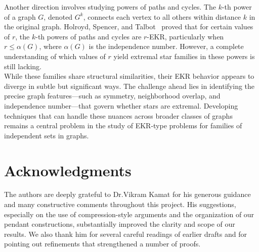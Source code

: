 \documentclass{article}
\theoremstyle{definition}
\newcommand{\1}{\mathbf{1}}
\begin{document}
\noindent Another direction involves studying powers of paths and cycles. The $k$-th power of a graph $G$, denoted $G^k$, connects each vertex to all others within distance $k$ in the original graph. Holroyd, Spencer, and Talbot~\cite{Holroyd2005} proved that for certain values of $r$, the $k$-th powers of paths and cycles are $r$-EKR, particularly when $r \leq \alpha(G)$, where $\alpha(G)$ is the independence number. However, a complete understanding of which values of $r$ yield extremal star families in these powers is still lacking.\\

\noindent While these families share structural similarities, their EKR behavior appears to diverge in subtle but significant ways. The challenge ahead lies in identifying the precise graph features—such as symmetry, neighborhood overlap, and independence number—that govern whether stars are extremal. Developing techniques that can handle these nuances across broader classes of graphs remains a central problem in the study of EKR-type problems for families of independent sets in graphs.









\section*{Acknowledgments}
The authors are deeply grateful to Dr.Vikram Kamat for his generous guidance and many constructive comments throughout this project. His suggestions, especially on the use of compression-style arguments and the organization of our pendant constructions, substantially improved the clarity and scope of our results. We also thank him for several careful readings of earlier drafts and for pointing out refinements that strengthened a number of proofs. 
\end{document}
